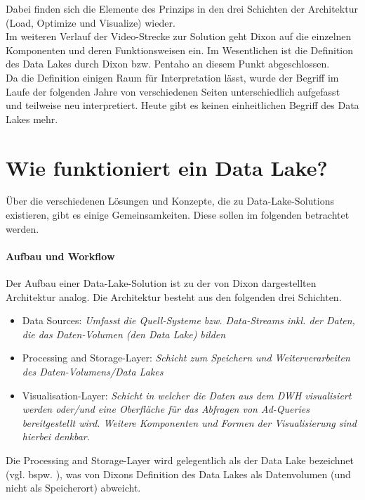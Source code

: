 \documentclass[twoside,twocolumn]{article}
\begin{document}
\noindent Dabei finden sich die Elemente des Prinzips in den drei Schichten der Architektur (Load, Optimize und Visualize) wieder.\cite{src6}\cite{src6b} \\
Im weiteren Verlauf der Video-Strecke zur Solution geht Dixon auf die einzelnen Komponenten und deren Funktionsweisen ein. Im Wesentlichen ist die Definition des Data Lakes durch Dixon bzw. Pentaho an diesem Punkt abgeschlossen.\\
Da die Definition einigen Raum für Interpretation lässt, wurde der Begriff im Laufe der folgenden Jahre von verschiedenen Seiten unterschiedlich aufgefasst und teilweise neu interpretiert. Heute gibt es keinen einheitlichen Begriff des Data Lakes mehr.\cite{src7}

\section{Wie funktioniert ein Data Lake?}
Über die verschiedenen Lösungen und Konzepte, die zu Data-Lake-Solutions existieren, gibt es einige Gemeinsamkeiten. Diese sollen im folgenden betrachtet werden.

\paragraph{Aufbau und Workflow}
Der Aufbau einer Data-Lake-Solution ist zu der von Dixon dargestellten Architektur analog.
Die Architektur besteht aus den folgenden drei Schichten.\cite{src8} \cite{src9}
\begin{itemize}
	\item Data Sources: \textit{Umfasst die Quell-Systeme bzw. Data-Streams inkl. der Daten, die das Daten-Volumen (den Data Lake) bilden}
	\item Processing and Storage-Layer: \textit{Schicht zum Speichern und Weiterverarbeiten des Daten-Volumens/Data Lakes} 
	\item Visualisation-Layer: \textit{Schicht in welcher die Daten aus dem DWH visualisiert werden oder/und eine Oberfläche für das Abfragen von Ad-Queries bereitgestellt wird. Weitere Komponenten und Formen der Visualisierung sind hierbei denkbar.}
\end{itemize}

Die Processing and Storage-Layer wird gelegentlich als der Data Lake bezeichnet (vgl. bspw. \cite{mdb}), was von Dixons Definition des Data Lakes als Datenvolumen (und nicht als Speicherort) abweicht.\\
\end{document}
